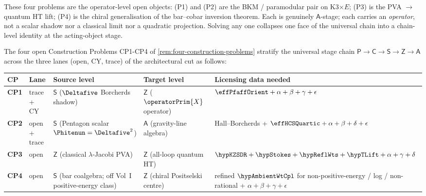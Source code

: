 \begin{remark}
These four problems are the operator-level open objects: (P1) and
(P2) are the BKM / paramodular pair
on K3$\times E$; (P3) is the PVA $\to$ quantum HT lift; (P4) is
the chiral generalisation of the bar--cobar inversion theorem.
Each is genuinely $\mathsf A$-stage; each carries an
\emph{operator}, not a scalar shadow nor a
classical limit nor a quadratic projection. Solving any one
collapses one face of the universal chain into a chain-level
identity at the acting-object stage.
\end{remark}

\begin{theorem}
\label{thm:construction-problem-stage-stratification}%
%
%
The four open Construction Problems CP1-CP4 of
\cref{rem:four-construction-problems} stratify the universal stage
chain $\mathsf P \to \mathsf C \to \mathsf S \to \mathsf Z \to
\mathsf A$ across the three lanes (open, CY, trace) of the
architectural cut as follows:
\begin{center}
\renewcommand{\arraystretch}{1.3}
\begin{tabular}{l|l|l|l|l}
CP & Lane & Source level & Target level & Licensing data needed \\
\hline
\textbf{CP1} & trace + CY & $\mathsf S$ ($\Deltafive$ Borcherds shadow) &
 $\mathsf Z$ ($\operatorPrim{X}$ operator) &
 $\effPfaffOrient + \alpha + \beta + \gamma + \epsilon$ \\
\textbf{CP2} & open + trace & $\mathsf S$ (Pentagon scalar
 $\Phitenun = \Deltafive^2$) & $\mathsf A$ (gravity-line algebra) &
 Hall--Borcherds + $\effHCSQuartic + \alpha + \beta + \delta + \epsilon$ \\
\textbf{CP3} & open & $\mathsf Z$ (classical $\lambda$-Jacobi PVA) &
 $\mathsf Z$ (all-loop quantum HT) &
 $\hypKZSDR + \hypStokes + \hypReflWts + \hypTLift + \alpha + \gamma + \delta$ \\
\textbf{CP4} & open & $\mathsf S$ (bar coalgebra; off Vol~I
 positive-energy class) & $\mathsf Z$ (chiral Positselski centre) &
 refined $\hypAmbientWtCpl$ for non-positive-energy / log /
 non-rational + $\alpha + \beta + \gamma + \epsilon$ \\
\end{tabular}

\end{center}
\end{theorem}
